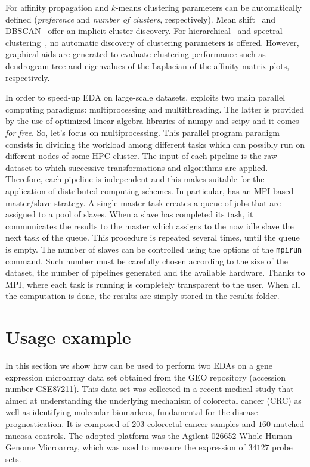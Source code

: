 For affinity propagation \cite{frey2007clustering} and $k$-means \cite{bishop2006pattern} clustering parameters can be automatically defined (\emph{preference} and \emph{number of clusters}, respectively).
Mean shift~\cite{comaniciu2002mean} and DBSCAN~\cite{ester1996density} offer an implicit cluster discovery.
For hierarchical~\cite{hastie2009elements} and spectral clustering~\cite{shi2000normalized}, no automatic discovery of clustering parameters is offered. However, graphical aids are generated to evaluate clustering performance such as dendrogram tree and eigenvalues of the Laplacian of the affinity matrix plots, respectively.

In order to speed-up EDA on large-scale datasets, \ade exploits two main parallel computing paradigms: multiprocessing and multithreading. The latter is provided by the use of optimized linear algebra libraries of {\sc numpy} and {\sc scipy} and it comes \textit{for free}. So, let's focus on multiprocessing.
This parallel program paradigm consists in dividing the workload among different tasks which can possibly run on different nodes of some HPC cluster.
The input of each \ade pipeline is the raw dataset to which successive transformations and algorithms are applied. Therefore, each pipeline is independent and this makes \ade suitable for the application of distributed computing schemes.
In particular, \ade has an MPI-based master/slave strategy. A single master task creates a queue of jobs that are assigned to a pool of slaves.
When a slave has completed its task, it communicates the results to the master which assigns to the now idle slave the next task of the queue. This procedure is repeated several times, until the queue is empty.
The number of slaves can be controlled using the options of the {\tt mpirun} command. Such number must be carefully chosen according to the size of the dataset, the number of pipelines generated and the available hardware.
Thanks to MPI, where each task is running is completely transparent to the user. When all the computation is done, the results are simply stored in the results folder.

\section{Usage example} \label{sec:usage_example}
In this section we show how \ade can be used to perform two EDAs on a gene expression microarray data set obtained from the GEO repository (accession number GSE87211).
This data set was collected in a recent medical study that aimed at understanding the underlying mechanism of colorectal cancer (CRC) as well as identifying molecular biomarkers, fundamental for the disease prognostication.
It is composed of $203$ colorectal cancer samples and $160$ matched mucosa controls. The adopted platform was the Agilent-026652 Whole Human Genome Microarray, which was used to measure the expression of $34127$ probe sets.

